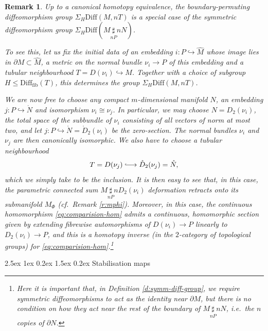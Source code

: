 \documentclass[reqno,a4paper]{article}
\makeatletter
\numberwithin{equation}{section}
\theoremstyle{italicised}
\theoremstyle{upright}
\newtheorem{rmk}[thm]{Remark}
\theoremstyle{italicised-restate}
\renewcommand*{\section}{\@startsection{section}{1}{\z@}%
	{2.5ex \@plus 1ex \@minus 0.2ex}%
	{1.5ex \@plus 0.2ex}%
	{\normalfont\large\bfseries}}
\newcommand{\lhto}{\lhook\joinrel\longrightarrow}
\newcommand{\cf}{\textit{cf}.\ }
\renewcommand{\leq}{\leqslant}
\makeatother
\begin{document}
\begin{rmk}\label{r:canonical-heq}
Up to a canonical homotopy equivalence, the boundary-permuting diffeomorphism group $\Sigma_H \mathrm{Diff}(M,nT)$ is a special case of the symmetric diffeomorphism group $\Sigma_H \mathrm{Diff}(M \underset{nP}{\sharp} nN)$.

To see this, let us fix the initial data of an embedding $i \colon P \hookrightarrow \hat{M}$ whose image lies in $\partial M \subset \hat{M}$, a metric on the normal bundle $\nu_i \to P$ of this embedding and a tubular neighbourhood $T = D(\nu_i) \hookrightarrow \hat{M}$. Together with a choice of subgroup $H \leq \mathrm{Diff}_{\mathrm{fib}}(T)$, this determines the group $\Sigma_H \mathrm{Diff}(M,nT)$.

We are now free to choose any compact $m$-dimensional manifold $N$, an embedding $j \colon P \hookrightarrow \mathring{N}$ and isomorphism $\nu_i \cong \nu_j$. In particular, we may choose $N = D_2(\nu_i)$, the total space of the subbundle of $\nu_i$ consisting of all vectors of norm at most two, and let $j \colon P \hookrightarrow \mathring{N} = \mathring{D}_2(\nu_i)$ be the zero-section. The normal bundles $\nu_i$ and $\nu_j$ are then canonically isomorphic. We also have to choose a tubular neighbourhood
\[
T = D(\nu_j) \lhto \mathring{D}_2(\nu_j) = \mathring{N},
\]
which we simply take to be the inclusion. It is then easy to see that, in this case, the parametric connected sum $M \underset{nP}{\sharp} nD_2(\nu_i)$ deformation retracts onto its submanifold $M_\Phi$ (\cf Remark \ref{r:mphi}). Moreover, in this case, the continuous homomorphism \eqref{eq:comparision-hom} admits a continuous, homomorphic section given by extending fibrewise automorphisms of $D(\nu_i) \to P$ linearly to $D_2(\nu_i) \to P$, and this is a homotopy inverse (in the $2$-category of topological groups) for \eqref{eq:comparision-hom}.\footnote{Here it is important that, in Definition \ref{d:symm-diff-group}, we require symmetric diffeomorphisms to act as the identity near $\partial M$, but there is no condition on how they act near the rest of the boundary of $M \underset{nP}{\sharp} nN$, i.e.\ the $n$ copies of $\partial N$.}
\end{rmk}


\section{Stabilisation maps}\label{s:stab}
\end{document}
